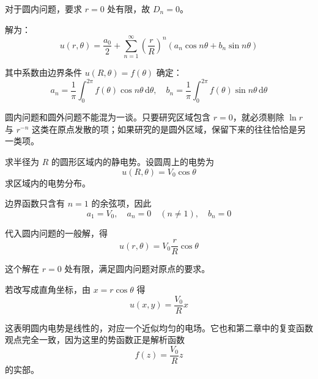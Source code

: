 对于圆内问题，要求 $r = 0$ 处有限，故 $D_n = 0$。

解为：
\begin{equation}
    u(r, \theta) = \frac{a_0}{2} + \sum_{n=1}^{\infty}\left(\frac{r}{R}\right)^n\left(a_n\cos n\theta + b_n\sin n\theta\right)
\end{equation}

其中系数由边界条件 $u(R, \theta) = f(\theta)$ 确定：
\begin{equation}
    a_n = \frac{1}{\pi}\int_0^{2\pi} f(\theta)\cos n\theta\,\mathrm{d}\theta, \quad b_n = \frac{1}{\pi}\int_0^{2\pi} f(\theta)\sin n\theta\,\mathrm{d}\theta
\end{equation}

\begin{jinshi}
圆内问题和圆外问题不能混为一谈。只要研究区域包含 $r = 0$，就必须剔除 $\ln r$ 与 $r^{-n}$ 这类在原点发散的项；如果研究的是圆外区域，保留下来的往往恰恰是另一类项。
\end{jinshi}

\begin{lizi}{}{}
求半径为 $R$ 的圆形区域内的静电势。设圆周上的电势为
\begin{equation}
    u(R, \theta) = V_0\cos\theta
\end{equation}
求区域内的电势分布。

\begin{jie}
边界函数只含有 $n = 1$ 的余弦项，因此
\begin{equation}
    a_1 = V_0, \quad a_n = 0 \quad (n \neq 1), \quad b_n = 0
\end{equation}

代入圆内问题的一般解，得
\begin{equation}
    u(r, \theta) = V_0\frac{r}{R}\cos\theta
\end{equation}

这个解在 $r = 0$ 处有限，满足圆内问题对原点的要求。

若改写成直角坐标，由 $x = r\cos\theta$ 得
\begin{equation}
    u(x, y) = \frac{V_0}{R}x
\end{equation}

这表明圆内电势是线性的，对应一个近似均匀的电场。它也和第二章中的复变函数观点完全一致，因为这里的势函数正是解析函数
\begin{equation}
    f(z) = \frac{V_0}{R}z
\end{equation}
的实部。
\end{jie}
\end{lizi}

